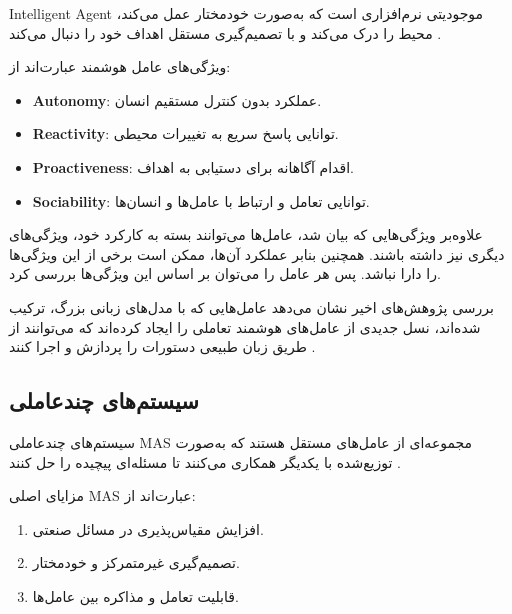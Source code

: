 \documentclass[a4paper,fleqn]{report}
\begin{document}
\gls{Intelligent Agent} موجودیتی نرم‌افزاری است که به‌صورت خودمختار عمل می‌کند، محیط را درک می‌کند و با تصمیم‌گیری مستقل اهداف خود را دنبال می‌کند \cite{wooldridge2009introduction}. 

ویژگی‌های عامل هوشمند عبارت‌اند از:
\begin{itemize}
	 \item \textbf{\gls{Autonomy}}: عملکرد بدون کنترل مستقیم انسان.
	\item \textbf{\gls{Reactivity}}: توانایی پاسخ سریع به تغییرات محیطی.
	\item \textbf{\gls{Proactiveness}}: اقدام آگاهانه برای دستیابی به اهداف.
	\item \textbf{\gls{Sociability}}: توانایی تعامل و ارتباط با عامل‌ها و انسان‌ها.
\end{itemize}

علاوه‌بر ویژگی‌هایی که بیان شد، عامل‌ها می‌توانند بسته به کارکرد خود، ویژگی‌های دیگری نیز داشته باشند. همچنین بنابر عملکرد آن‌ها، ممکن است برخی از این ویژگی‌ها را دارا نباشد. پس هر عامل را می‌توان بر اساس این ویژگی‌ها بررسی کرد.

بررسی پژوهش‌های اخیر نشان می‌دهد عامل‌هایی که با مدل‌های زبانی بزرگ، ترکیب شده‌اند، نسل جدیدی از عامل‌های هوشمند تعاملی را ایجاد کرده‌اند که می‌توانند از طریق زبان طبیعی دستورات را پردازش و اجرا کنند \cite{park2025interactive}.


\subsection{سیستم‌های چندعاملی}

سیستم‌های چندعاملی \gls{MAS} مجموعه‌ای از عامل‌های مستقل هستند که به‌صورت توزیع‌شده با یکدیگر همکاری می‌کنند تا مسئله‌ای پیچیده را حل کنند \cite{dorri2018multiagent,bellifemine2007jade}. 

مزایای اصلی \gls{MAS} عبارت‌اند از:
\begin{enumerate}
	\item افزایش مقیاس‌پذیری در مسائل صنعتی.
	\item تصمیم‌گیری غیرمتمرکز و خودمختار.
	\item قابلیت تعامل و مذاکره بین عامل‌ها.
\end{enumerate}
\end{document}
